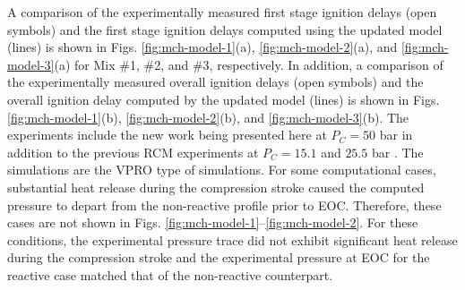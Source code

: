 \documentclass[12pt, letterpaper]{article}
\begin{document}
A comparison of the experimentally measured first stage ignition delays (open
symbols) and the first stage ignition delays computed using the updated model
(lines) is shown in Figs. \ref{fig:mch-model-1}(a), \ref{fig:mch-model-2}(a),
and \ref{fig:mch-model-3}(a) for Mix \#1, \#2, and \#3, respectively. In
addition, a comparison of the experimentally measured overall ignition delays
(open symbols) and the overall ignition delay computed by the updated model
(lines) is shown in Figs. \ref{fig:mch-model-1}(b), \ref{fig:mch-model-2}(b),
and \ref{fig:mch-model-3}(b). The experiments include the new work being
presented here at $P_C=50$ bar in addition to the previous RCM experiments at
$P_C=15.1$ and $25.5$ bar \cite{Mittal2009}. The simulations are the VPRO type
of simulations. For some computational cases, substantial heat release during
the compression stroke caused the computed pressure to depart from the
non-reactive profile prior to EOC. Therefore, these cases are not shown in
Figs. \ref{fig:mch-model-1}--\ref{fig:mch-model-2}. For these conditions, the
experimental pressure trace did not exhibit significant heat release during
the compression stroke and the experimental pressure at EOC for the reactive
case matched that of the non-reactive counterpart.
\end{document}
